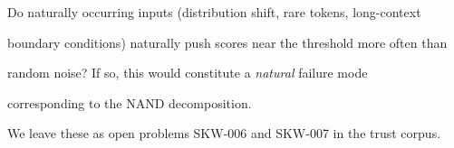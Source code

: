 \begin{openproblem}






Do naturally occurring inputs (distribution shift, rare tokens, long-context






boundary conditions) naturally push scores near the threshold more often than






random noise?  If so, this would constitute a \emph{natural} failure mode






corresponding to the NAND decomposition.






\end{openproblem}













We leave these as open problems SKW-006 and SKW-007 in the trust corpus.


















































